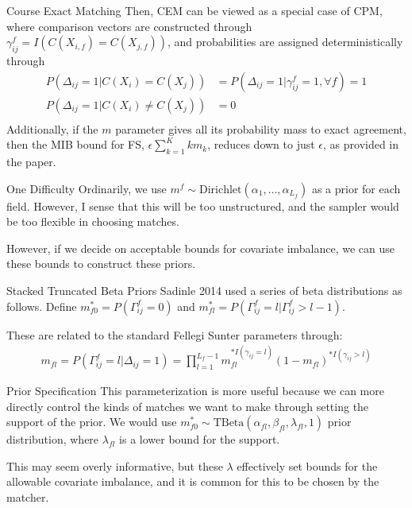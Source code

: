 \documentclass{beamer}
\begin{document}
\begin{frame}{Course Exact Matching}
	Then, CEM can be viewed as a special case of CPM, where comparison vectors are constructed through $\gamma_{ij}^f = I(C(X_{i, f}) = C(X_{j, f}))$, and probabilities are assigned deterministically through \linebreak
\begin{align*}
	P(\Delta_{ij} = 1 | C(X_i) = C(X_j)) &= P(\Delta_{ij} = 1 |\gamma_{ij}^f = 1 , \forall f) = 1 \\
	P(\Delta_{ij} = 1 | C(X_i) \neq C(X_j)) &= 0 \\
\end{align*}
Additionally, if the $m$ parameter gives all its probability mass to exact agreement, then the MIB bound for FS,  $\epsilon \sum_{k=1}^K k m_k$,  reduces down to just $\epsilon$, as provided in the paper.
\end{frame}

\begin{frame}{One Difficulty}
	Ordinarily, we use $m^f \sim \text{Dirichlet}(\alpha_1, \ldots, \alpha_{L_f})$ as a prior for each field. However, I sense that this will be too unstructured, and the sampler would be too flexible in choosing matches. \linebreak
		
	However, if we decide on acceptable bounds for covariate imbalance, we can use these bounds to construct these priors.
\end{frame}

\begin{frame}{Stacked Truncated Beta Priors}
	Sadinle 2014 used a series of beta distributions as follows. Define $m^{*}_{f0} = P(\Gamma_{ij}^f = 0)$ and $m^{*}_{fl} = P(\Gamma_{ij}^f = l|\Gamma_{ij}^f > l-1)$. \linebreak
	
	These are related to the standard Fellegi Sunter parameters through:
	\begin{align}
		m_{fl} = P(\Gamma_{ij}^f = l | \Delta_{ij} = 1) = \prod_{l=1}^{L_f - 1} m_{fl}^{*I(\gamma_{ij} = l)}(1 - m_{fl})^{*I(\gamma_{ij} > l)}
	\end{align}

\end{frame}

\begin{frame}{Prior Specification}
	This parameterization is more useful because we can more directly control the kinds of matches we want to make through setting the support of the prior. We would use $m^{*}_{f0} \sim \text{TBeta}(\alpha_{fl}, \beta_{fl}, \lambda_{fl}, 1)$ prior distribution, where $\lambda_{fl}$ is a lower bound for the support. \linebreak
	
	This may seem overly informative, but these $\lambda$ effectively set bounds for the allowable covariate imbalance, and it is common for this to be chosen by the matcher.
\end{frame}
\end{document}
